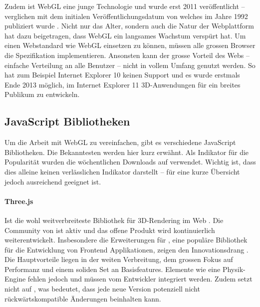 Zudem ist WebGL eine junge Technologie und wurde erst 2011 veröffentlicht \cite{webGl1Spec} – verglichen mit dem initialen Veröffentlichungsdatum von  welches im Jahre 1992 publiziert wurde \cite{openGlSpec}.
Nicht nur das Alter, sondern auch die Natur der Webplattform hat dazu beigetragen, dass WebGL ein langsames Wachstum verspürt hat. Um einen Webstandard wie WebGL einsetzen zu können, müssen alle grossen Browser die Spezifikation implementieren. Ansonsten kann der grosse Vorteil des Webs – einfache Verteilung an alle Benutzer – nicht in vollem Umfang genutzt werden. So hat zum Beispiel Internet Explorer 10 keinen Support und es wurde erstmals Ende 2013 möglich, im Internet Explorer 11 3D-Anwendungen für ein breites Publikum zu entwickeln.

\subsection{JavaScript Bibliotheken}
Um die Arbeit mit WebGL zu vereinfachen, gibt es verschiedene JavaScript Bibliotheken. Die Bekanntesten werden hier kurz erwähnt. Als Indikator für die Popularität wurden die wöchentlichen Downloads auf  verwendet. Wichtig ist, dass dies alleine keinen verlässlichen Indikator darstellt – für eine kurze Übersicht jedoch ausreichend geeignet ist.

\paragraph{Three.js}
Ist die wohl weitverbreiteste Bibliothek für 3D-Rendering im Web \cite{threeNpmPackage}.
Die Community von  ist aktiv und das offene Produkt wird kontinuierlich weiterentwickelt. Insbesondere die Erweiterungen für , eine populäre Bibliothek für die Entwicklung von Frontend Applikationen, zeigen den Innovationsdrang \cite{threeFiberGithub, reactNpmPackage}.
Die Hauptvorteile liegen in der weiten Verbreitung, dem grossen Fokus auf Performanz und einem soliden Set an Basisfeatures. Elemente wie eine Physik-Engine fehlen jedoch und müssen vom Entwickler integriert werden. Zudem setzt  nicht auf , was bedeutet, dass jede neue Version potenziell nicht rückwärtskompatible Änderungen beinhalten kann.

